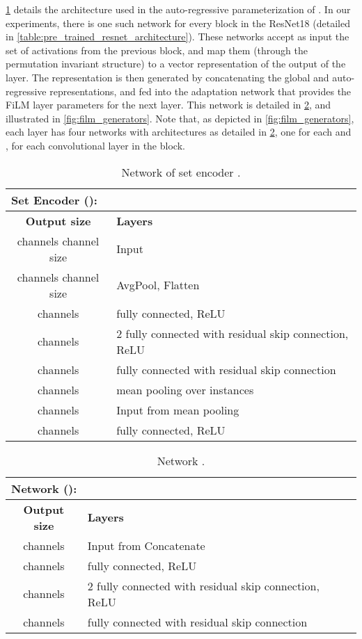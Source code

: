 \documentclass{article}
\theoremstyle{definition}
\begin{document}
\cref{table:ar_set_encoders} details the architecture used in the auto-regressive parameterization of . In our experiments, there is one such network for every block in the ResNet18 (detailed in \cref{table:pre_trained_resnet_architecture}). These networks accept as input the set of activations from the previous block, and map them (through the permutation invariant structure) to a vector representation of the output of the layer. The representation  is then generated by concatenating the global and auto-regressive representations, and fed into the adaptation network that provides the FiLM layer parameters for the next layer. This network is detailed in \cref{table:film_generator}, and illustrated in \cref{fig:film_generators}. Note that, as depicted in \cref{fig:film_generators}, each layer has four networks with architectures as detailed in \cref{table:film_generator}, one for each  and , for each convolutional layer in the block.

\begin{table}[h]
    \caption{Network of set encoder .}
    \label{table:ar_set_encoders}
    \centering
	\begin{tabular}{cl}
	  \multicolumn{2}{l}{\textbf{Set Encoder ():} 
	    } \\
      \toprule
      \textbf{Output size} & \textbf{Layers} \\
      \midrule
        channels   channel size & Input  \\
        channels   channel size & AvgPool, Flatten \\
        channels & fully connected, ReLU \\
        channels & 2  fully connected with residual skip connection, ReLU \\
        channels & fully connected with residual skip connection \\
        channels & mean pooling over instances \\
        channels & Input from mean pooling \\
        channels & fully connected, ReLU \\      \bottomrule
	\end{tabular}
\end{table}

\begin{table}[h]
    \caption{Network .}
    \label{table:film_generator}
	\centering
	\begin{tabular}{cl}
	  \multicolumn{2}{l}{\textbf{Network ():} }\\
 		\toprule
        \textbf{Output size} & \textbf{Layers} \\
        \midrule
         channels &  Input from Concatenate \\
         channels & fully connected, ReLU \\
         channels & 2  fully connected with residual skip connection, ReLU \\
         channels & fully connected with residual skip connection \\
		\bottomrule
	\end{tabular}
\end{table}
\end{document}
